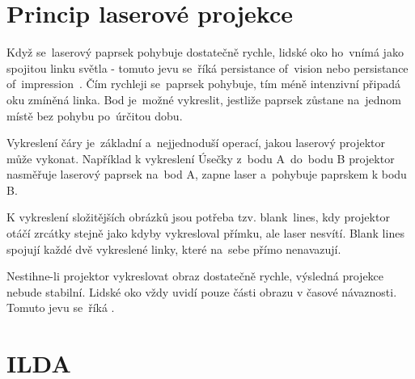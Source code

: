 
\section{Princip laserové projekce}\label{sec:projection-princip}
Když se~laserový paprsek pohybuje dostatečně rychle, lidské oko ho~vnímá jako spojitou linku světla - tomuto jevu se~říká persistance of~vision nebo persistance of~impression~\cite{persistance-of-vision}.
Čím rychleji se~paprsek pohybuje, tím méně intenzivní připadá oku zmíněná linka. Bod je~možné vykreslit, jestliže paprsek zůstane na~jednom místě bez pohybu po~úrčitou dobu.

Vykreslení čáry je~základní a~nejjednoduší operací, jakou laserový projektor může vykonat. Například k vykreslení Úsečky z~bodu A~do~bodu B projektor nasměřuje laserový paprsek na~bod A, zapne laser a~pohybuje paprskem k bodu B.

K vykreslení složitějších obrázků jsou potřeba tzv. blank\ lines, kdy projektor otáčí zrcátky stejně jako kdyby vykresloval přímku, ale laser nesvítí. Blank lines spojují každé dvě vykreslené linky, které na~sebe přímo nenavazují.

Nestihne-li projektor vykreslovat obraz dostatečně rychle, výsledná projekce nebude stabilní. Lidské oko vždy uvidí pouze části obrazu v časové návaznosti. Tomuto jevu se~říká .

\section{ILDA}
